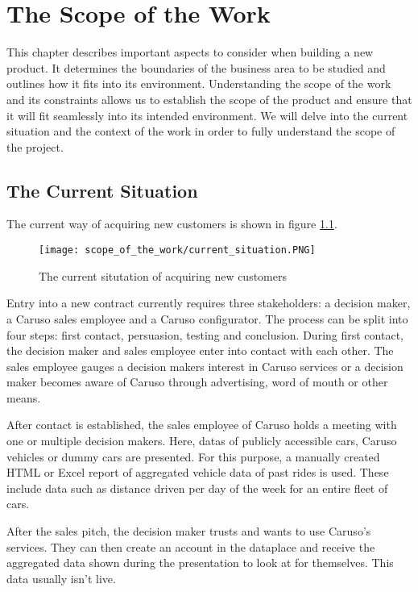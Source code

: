 \chapter{The Scope of the Work}

This chapter describes important aspects to consider when building a new product. It determines the boundaries of the business area to be studied and outlines how it fits into its environment. Understanding the scope of the work and its constraints allows us to establish the scope of the product and ensure that it will fit seamlessly into its intended environment. We will delve into the current situation and the context of the work in order to fully understand the scope of the project.

\section{The Current Situation}
The current way of acquiring new customers is shown in figure \ref{ScopeOfWork:Situation}.
\begin{figure}[ht]
  \centering
  \texttt{[image: scope\_of\_the\_work/current\_situation.PNG]}
  \caption{The current situtation of acquiring new customers}
  \label{ScopeOfWork:Situation}
\end{figure}

Entry into a new contract currently requires three \glspl{stakeholder}: a decision maker, a Caruso sales employee and a Caruso configurator. The process can be split into four steps: first contact, persuasion, testing and conclusion. During first contact, the decision maker and sales employee enter into contact with each other. The sales employee gauges a decision makers interest in Caruso services or a decision maker becomes aware of Caruso through advertising, word of mouth or other means.

After contact is established, the sales employee of Caruso holds a meeting with one or multiple decision makers. Here, \glspl{data} of publicly accessible cars, Caruso vehicles or dummy cars are presented. For this purpose, a manually created HTML or Excel report of aggregated vehicle data of past rides is used. These include data such as distance driven per day of the week for an entire fleet of cars.

After the sales pitch, the decision maker trusts and wants to use Caruso's services. They can then create an account in the \gls{dataplace} and receive the aggregated data shown during the presentation to look at for themselves. This data usually isn't live.

